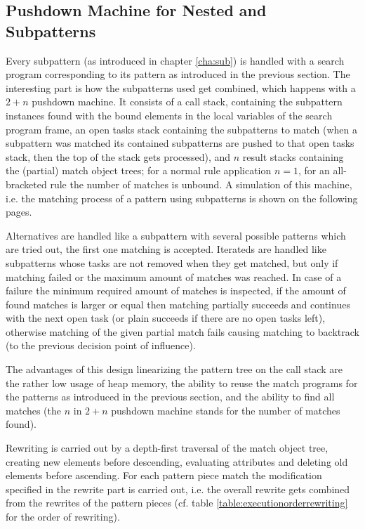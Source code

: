 \subsection*{Pushdown Machine for Nested and Subpatterns}\label{pushdownmachine}
Every subpattern (as introduced in chapter \ref{cha:sub}) is handled with a search program corresponding to its pattern as introduced in the previous section. 
The interesting part is how the subpatterns used get combined, which happens with a $2+n$ pushdown machine.
It consists of a call stack, containing the subpattern instances found with the bound elements in the local variables of the search program frame, an open tasks stack containing the subpatterns to match (when a subpattern was matched its contained subpatterns are pushed to that open tasks stack, then the top of the stack gets processed), and $n$ result stacks containing the (partial) match object trees; for a normal rule application $n=1$, for an all-bracketed rule the number of matches is unbound.
A simulation of this machine, i.e. the matching process of a pattern using subpatterns is shown on the following pages.

Alternatives are handled like a subpattern with several possible patterns which are tried out, the first one matching is accepted.
Iterateds are handled like subpatterns whose tasks are not removed when they get matched, but only if matching failed or the maximum amount of matches was reached. In case of a failure the minimum required amount of matches is inspected, if the amount of found matches is larger or equal then matching partially succeeds and continues with the next open task (or plain succeeds if there are no open tasks left), otherwise matching of the given partial match fails causing matching to backtrack (to the previous decision point of influence).

The advantages of this design linearizing the pattern tree on the call stack are the rather low usage of heap memory, the ability to reuse the match programs for the patterns as introduced in the previous section, and the ability to find all matches (the $n$ in $2+n$ pushdown machine stands for the number of matches found).

Rewriting is carried out by a depth-first traversal of the match object tree, creating new elements before descending, evaluating attributes and deleting old elements before ascending. For each pattern piece match the modification specified in the rewrite part is carried out, i.e. the overall rewrite gets combined from the rewrites of the pattern pieces (cf. table \ref{table:executionorderrewriting} for the order of rewriting).

